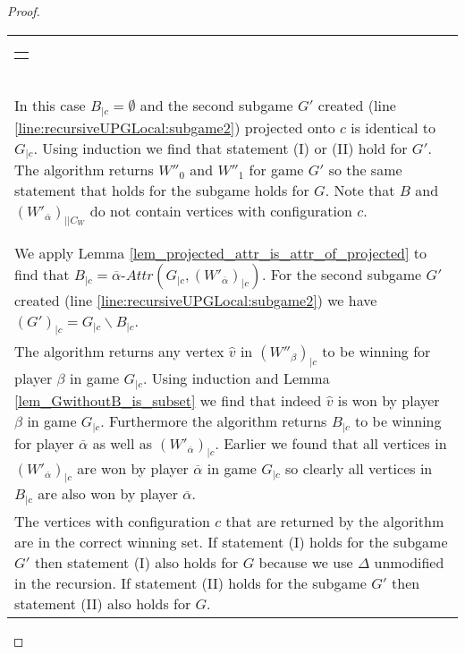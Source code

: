 \begin{theorem}
\begin{proof}
\begin{longtable}{|p{14.2cm}}
\begin{tabular}{|p{14cm}}
\begin{tabular}{|p{13.8cm}}
				\end{tabular}\\\\
				\begin{tabular}{|p{13.8cm}}
					Assume $c \notin C_B$\\
					\hline
					\begin{tabular}{|p{13.6cm}}
						Assume $(W'_{\overline{\alpha}})_{|c} = \emptyset$\\
						\hline
						In this case $B_{|c} = \emptyset$ and the second subgame $G'$ created (line \ref{line:recursiveUPGLocal:subgame2}) projected onto $c$ is identical to $G_{|c}$. Using induction we find that statement (I) or (II) hold for $G'$. The algorithm returns $W''_0$ and $W''_1$ for game $G'$ so the same statement that holds for the subgame holds for $G$. Note that $B$ and $(W'_{\overline{\alpha}})_{||C_W}$ do not contain vertices with configuration $c$.
					\end{tabular}\\\\
					\begin{tabular}{|p{13.6cm}}
						Assume $(W'_{\overline{\alpha}})_{|c} \neq \emptyset$\\
						\hline
						We apply Lemma \ref{lem_projected_attr_is_attr_of_projected} to find that $B_{|c} = \overline{\alpha}\textit{-Attr}(G_{|c},(W'_{\overline{\alpha}})_{|c})$. For the second subgame $G'$ created (line \ref{line:recursiveUPGLocal:subgame2}) we have $(G')_{|c} = G_{|c} \backslash B_{|c}$.\\
						The algorithm returns any vertex $\hat{v}$ in $(W''_\beta)_{|c}$ to be winning for player $\beta$ in game $G_{|c}$. Using induction and Lemma \ref{lem_GwithoutB_is_subset} we find that indeed $\hat{v}$ is won by player $\beta$ in game $G_{|c}$. Furthermore the algorithm returns $B_{|c}$ to be winning for player $\overline{\alpha}$ as well as $(W'_{\overline{\alpha}})_{|c}$. Earlier we found that all vertices in $(W'_{\overline{\alpha}})_{|c}$ are won by player $\overline{\alpha}$ in game $G_{|c}$ so clearly all vertices in $B_{|c}$ are also won by player $\overline{\alpha}$.\\
						The vertices with configuration $c$ that are returned by the algorithm are in the correct winning set. If statement (I) holds for the subgame $G'$ then statement (I) also holds for $G$ because we use $\Delta$ unmodified in the recursion. If statement (II) holds for the subgame $G'$ then statement (II) also holds for $G$.
					\end{tabular}
				\end{tabular}
			\end{tabular}
		\end{longtable}
	\end{proof}
\end{theorem}

